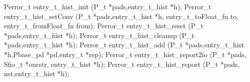 \begin{code}
Perror\_t entry\_t\_hist\_init (P\_t *pads,entry\_t\_hist *h);
Perror\_t entry\_t\_hist\_setConv (P\_t *pads,entry\_t\_hist *h,
entry\_t\_toFloat\_fn to, entry\_t\_fromFloat\_fn from);
Perror\_t entry\_t\_hist\_reset (P\_t *pads,entry\_t\_hist *h);
Perror\_t entry\_t\_hist\_cleanup (P\_t *pads,entry\_t\_hist *h);
Perror\_t entry\_t\_hist\_add (P\_t *pads,entry\_t\_hist *h,Pbase\_pd
*pd,entry\_t *rep);
Perror\_t entry\_t\_hist\_report2io (P\_t *pads, Sfio\_t *ourstr,
entry\_t\_hist *h); 
Perror\_t entry\_t\_hist\_report (P\_t *pads, nst,entry\_t\_hist *h);
\end{code}
